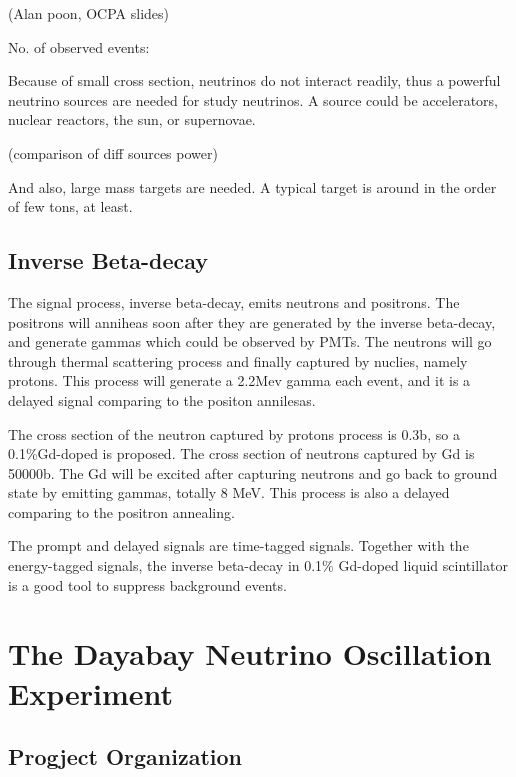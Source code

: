 (Alan poon, OCPA slides)

No. of observed events:

Because of small cross section, neutrinos do not interact readily, thus
a powerful neutrino sources are needed for study neutrinos. A source could be
accelerators, nuclear reactors, the sun, or supernovae.

(comparison of diff sources power)

And also, large mass targets are needed. A typical target is around in the order
of few tons, at least.





\subsection{Inverse Beta-decay}

The signal process, inverse beta-decay, emits neutrons and positrons.
The positrons will anniheas soon after they are generated by the inverse beta-decay,
and generate gammas which could be observed by PMTs. The neutrons will go through
thermal scattering process and finally captured by nuclies, namely protons. This
process will generate a 2.2Mev gamma each event, and it is a delayed signal comparing
to the positon annilesas.

The cross section of the neutron captured by protons process is 0.3b, so a 0.1\%Gd-doped
is proposed. The cross section of neutrons captured by Gd is 50000b. The Gd will be excited
after capturing neutrons and go back to ground state by emitting gammas, totally 8 MeV. This
process is also a delayed comparing to the positron annealing.


The prompt and delayed signals are time-tagged signals.
Together with the energy-tagged signals, the inverse beta-decay
in 0.1\% Gd-doped liquid scintillator is a good tool to suppress
background events.







\section{The Dayabay Neutrino Oscillation Experiment}



\subsection{Progject Organization}

